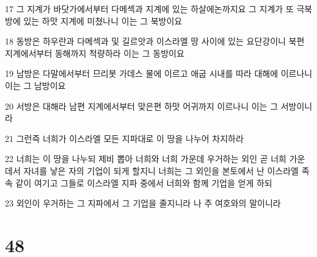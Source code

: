 \par 17 그 지계가 바닷가에서부터 다메섹과 지계에 있는 하살에논까지요 그 지계가 또 극북방에 있는 하맛 지계에 미쳤나니 이는 그 북방이요
\par 18 동방은 하우란과 다메섹과 및 길르앗과 이스라엘 땅 사이에 있는 요단강이니 북편 지계에서부터 동해까지 척량하라 이는 그 동방이요
\par 19 남방은 다말에서부터 므리봇 가데스 물에 이르고 애굽 시내를 따라 대해에 이르나니 이는 그 남방이요
\par 20 서방은 대해라 남편 지계에서부터 맞은편 하맛 어귀까지 이르나니 이는 그 서방이니라
\par 21 그런즉 너희가 이스라엘 모든 지파대로 이 땅을 나누어 차지하라
\par 22 너희는 이 땅을 나누되 제비 뽑아 너희와 너희 가운데 우거하는 외인 곧 너희 가운데서 자녀를 낳은 자의 기업이 되게 할지니 너희는 그 외인을 본토에서 난 이스라엘 족속 같이 여기고 그들로 이스라엘 지파 중에서 너희와 함께 기업을 얻게 하되
\par 23 외인이 우거하는 그 지파에서 그 기업을 줄지니라 나 주 여호와의 말이니라

\chapter{48}


